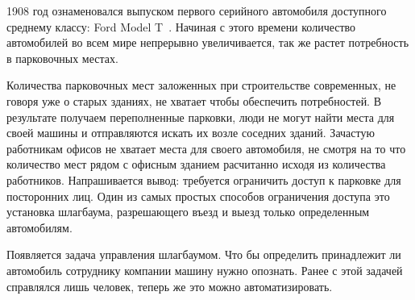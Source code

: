 \label{sec:intro}

1908 год ознаменовался выпуском первого серийного автомобиля доступного среднему классу: Ford Model T~\cite{ford_t}. Начиная с этого времени количество автомобилей во всем мире непрерывно увеличивается, так же растет потребность в парковочных местах.

Количества парковочных мест заложенных при строительстве современных, не говоря уже о старых зданиях, не хватает чтобы обеспечить потребностей. В результате получаем переполненные парковки, люди не могут найти места для своей машины и отправляются искать их возле соседних зданий. Зачастую работникам офисов не хватает места для своего автомобиля, не смотря на то что количество мест рядом с офисным зданием расчитанно исходя из количества работников. Напрашивается вывод: требуется ограничить доступ к парковке для посторонних лиц. Один из самых простых способов ограничения доступа это установка шлагбаума, разрешающего въезд и выезд только определенным автомобилям.

Появляется задача управления шлагбаумом. Что бы определить принадлежит ли автомобиль сотруднику компании машину нужно опознать. Ранее с этой задачей справлялся лишь человек, теперь же это можно автоматизировать.
